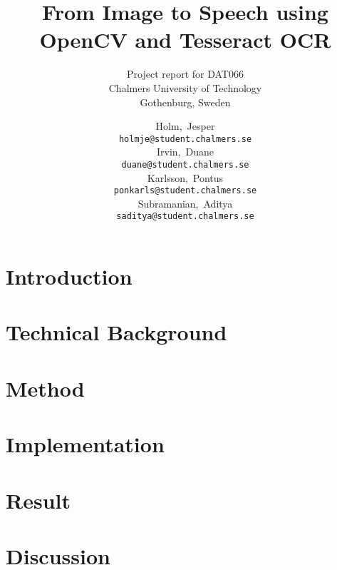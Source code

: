\documentclass[a4paper, english, abstract=on]{scrartcl}
\begin{document}

\title{From Image to Speech using \\ OpenCV and Tesseract OCR}
\subtitle{Project report for DAT066 \\
  Chalmers University of Technology \\
  Gothenburg, Sweden
}
\author{
  Holm,~Jesper \\ \texttt{holmje@student.chalmers.se}
  \\[3ex] Irvin,~Duane \\ \texttt{duane@student.chalmers.se}
  \\[3ex] Karlsson,~Pontus \\ \texttt{ponkarls@student.chalmers.se}
  \\[3ex] Subramanian,~Aditya \\ \texttt{saditya@student.chalmers.se}
}
\clearpage\maketitle
\thispagestyle{empty}
\pagebreak


\thispagestyle{empty}
\pagebreak

\hypersetup{linkcolor=black}
\tableofcontents
\thispagestyle{empty}
\pagebreak

\setcounter{page}{1}

\section{Introduction}


\section{Technical Background}


\section{Method}


\section{Implementation}


\section{Result}


\section{Discussion}


\pagebreak


\end{document}
